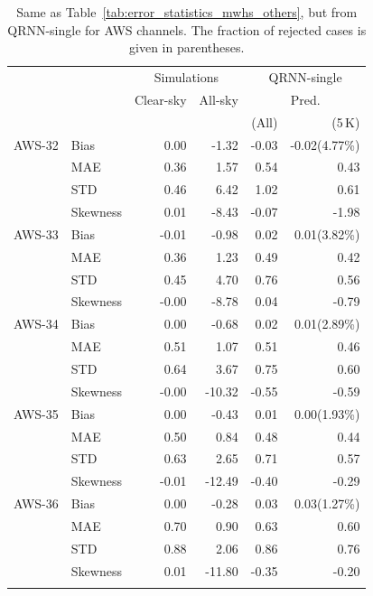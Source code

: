 \documentclass[amt, manuscript]{copernicus}
\begin{document}
\begin{table}[t]
	\caption{Same as Table~\ref{tab:error_statistics_mwhs_others}, but from QRNN-single for AWS channels. The fraction of rejected cases is given in parentheses. }
	\label{tab:statistics_qrnn_aws}
	\begin{tabular}{llrr|rr}
		\tophline
		&&\multicolumn{2}{c|}{Simulations}& \multicolumn{2}{c}{QRNN-single} \\
		\cline{3-6}
		&&Clear-sky &   All-sky &  \multicolumn{2}{c}{Pred.}  \\
		&&   &    &   (All) & (5\,K) \\
		\middlehline
		AWS-32  &Bias      & 0.00 & -1.32 &  -0.03 & -0.02(4.77\%) \\
				&MAE      & 0.36 &  1.57 &   0.54 &  0.43 \\
				&STD      & 0.46 &  6.42 &   1.02 &  0.61 \\
				&Skewness & 0.01 & -8.43 &  -0.07 & -1.98 \\
		\middlehline
		AWS-33	&Bias      & -0.01 & -0.98 &  0.02 &  0.01(3.82\%) \\
				&MAE      &  0.36 &  1.23 &  0.49 &  0.42 \\
				&STD      &  0.45 &  4.70 &  0.76 &  0.56 \\
				&Skewness & -0.00 & -8.78 &  0.04 & -0.79 \\
		
		\middlehline
		AWS-34	&Bias      &  0.00 &  -0.68 &  0.02 &  0.01(2.89\%) \\
				&MAE      &  0.51 &   1.07 &  0.51 &  0.46 \\
				&STD      &  0.64 &   3.67 &  0.75 &  0.60 \\
				&Skewness & -0.00 & -10.32 & -0.55 & -0.59 \\
		\middlehline
		AWS-35	&Bias      &  0.00 &  -0.43 &  0.01 &  0.00(1.93\%) \\
				&MAE      &  0.50 &   0.84 &  0.48 &  0.44 \\
				&STD      &  0.63 &   2.65 &  0.71 &  0.57 \\
				&Skewness & -0.01 & -12.49 & -0.40 & -0.29 \\
		\middlehline
		AWS-36  &Bias      & 0.00 &  -0.28 &   0.03  &  0.03(1.27\%) \\
				&MAE       & 0.70 &   0.90 &   0.63  &  0.60 \\
				&STD      & 0.88 &   2.06 &   0.86  &  0.76 \\
				&Skewness & 0.01 & -11.80 &  -0.35  & -0.20 \\
		\bottomhline				
	\end{tabular}
	\belowtable{} %
\end{table}
\end{document}
